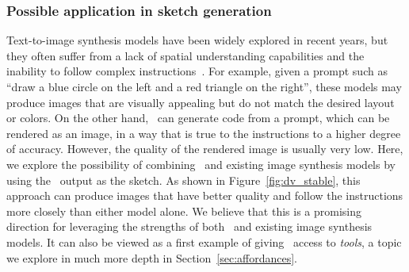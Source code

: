 \subsubsection{Possible application in sketch generation}
Text-to-image synthesis models have been widely explored in recent years, but they often suffer from a lack of spatial understanding capabilities and the inability to follow complex instructions~\cite{gokhale2022benchmarking}. For example, given a prompt such as ``draw a blue circle on the left and a red triangle on the right'', these models may produce images that are visually appealing but do not match the desired layout or colors. On the other hand, \DV\ can generate code from a prompt, which can be rendered as an image, in a way that is true to the instructions to a higher degree of accuracy. However, the quality of the rendered image is usually very low. Here, we explore the possibility of combining \DV\ and existing image synthesis models by using the \DV\ output as the sketch. As shown in Figure~\ref{fig:dv_stable}, this approach can produce images that have better quality and follow the instructions more closely than either model alone. We believe that this is a promising direction for leveraging the strengths of both \DV\ and existing image synthesis models. It can also be viewed as a first example of giving \DV\ access to {\em tools}, a topic we explore in much more depth in Section~\ref{sec:affordances}.

